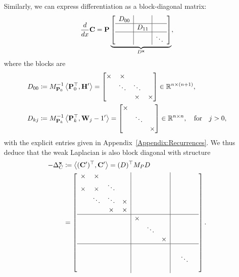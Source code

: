 \documentclass[hidelinks,onefignum,onetabnum]{siamart220329}
\def\bfP{{\bf P}}
\def\bfC{{\bf C}}
\def\bfW{{\bf W}}
\def\bfx{{\bf x}}
\def\bfH{{\bf H}}
\def\ip<#1>{\left\langle{#1}\right\rangle}
\def\D{{\rm d}}
\def\dx{\D x}
\def\appref#1{Appendix~\ref{Appendix:#1}}
\def\qfor{\quad\hbox{for}\quad}
\def\bbR{{\mathbb R}}
\begin{document}
Similarly, we can express differentiation as a block-diagonal matrix:
\[
	{\D \over \dx} {\bf C}  = \bfP \underbrace{\left[\begin{array}{c | c|c }
		D_{00}  &&\\
		\hline
		& D_{11}  &\\
		\hline
		&& \ddots 
	\end{array}\right]}_{D^\bfx},
\]
where the blocks are
\begin{align}
D_{00} &\coloneqq M_{\bfP_0}^{-1} \ip< \bfP_0^\top, \bfH'> 
= \begin{bmatrix}
\times & \times \\ & \ddots & \ddots \\&& \times & \times
\end{bmatrix}\in \bbR^{n \times (n+1)}, \label{rec:deriv1}\\
D_{kj} &\coloneqq M_{\bfP_k}^{-1} \ip< \bfP_k^\top, \bfW_{j-1}'> 
= \begin{bmatrix}
\times & \\ & \ddots  \\&& \times 
\end{bmatrix} \in \bbR^{n \times n},\qfor j > 0,\label{rec:deriv2}
\end{align}
with the explicit entries given in \appref{Recurrences}. We thus deduce that the weak Laplacian is also block diagonal with structure
\begin{align*}
-\Delta_C^\bfx &\coloneqq  \ip<(\bfC')^\top, \bfC'> = (D)^\top M_P D \\
&= \left[\begin{array}{c c c c | c c c | c c c }
\times & \times &    &        &  &   &         \\
\times & \times & \ddots &         &  & &        \\
  & \ddots & \ddots & \times       &   & &       \\
  &    & \times & \times      &   &    &        \\
  \hline
   &  &  &       & \times &   &     \\
   &  & &        &   & \ddots &    \\
    &  & &       &   &   & \times  \\
	 \hline
	  &  &    &  &&&     &  &   &    \\
	 &  &  &     &&&   &   & \ddots &    \\
	  &   &  &   &&&    &   &   &  
\end{array}\right].
\end{align*}
\end{document}
